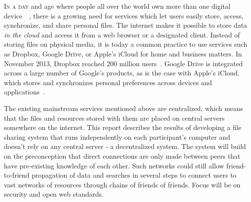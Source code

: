 \lettrine[lines=2, findent=2pt]{I}{n a day} and age where people all over the world own more than one digital device~\cite{OFCOMa:Online}~\cite{OFCOMb:Online}, there is a growing need for services which let users easily store, access, synchronize, and share personal files. The internet makes it possible to store data \emph{in the cloud} and access it from a web browser or a designated client. Instead of storing files on physical media, it is today a common practice to use services such as Dropbox, Google Drive, or Apple's iCloud for home and business matters. In November 2013, Dropbox reached 200 million users~\cite{Constine:2013:Online}. Google Drive is integrated across a large number of Google's products, as is the case with Apple's iCloud, which stores and synchronizes personal preferences across devices and applications~\cite{CloudTrend:Online}.

The existing mainstream services mentioned above are centralized, which means that the files and resources stored with them are placed on central servers somewhere on the internet. This report describes the results of developing a file sharing system that runs independently on each participant's computer and doesn't rely on any central server - a decentralized system. The system will build on the preconception that direct connections are only made between peers that have pre-existing knowledge of each other. Such networks could still allow friend-to-friend propagation of data and searches in several steps to connect users to vast networks of resources through chains of friends of friends. Focus will be on security and open web standards.







